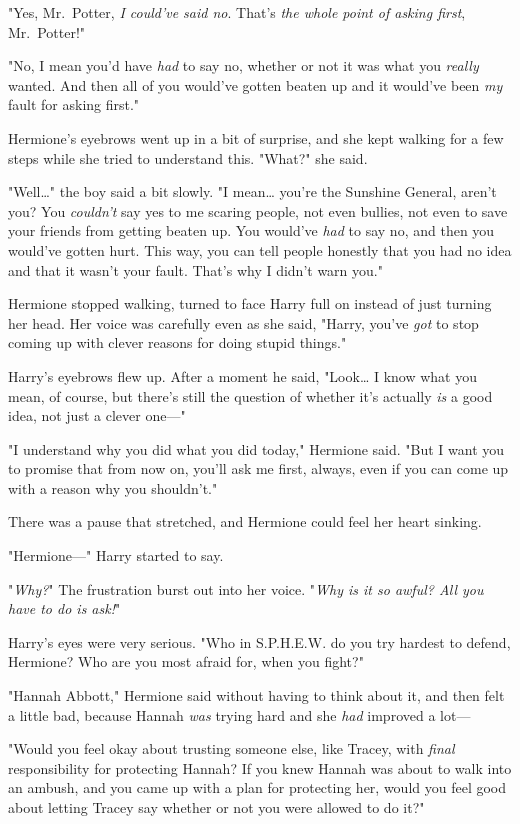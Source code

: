 "Yes, Mr.~Potter, \emph{I could've said no}. That's \emph{the whole point of 
asking first}, Mr.~Potter!"

"No, I mean you'd have \emph{had} to say no, whether or not it was what you 
\emph{really} wanted. And then all of you would've gotten beaten up and it 
would've been \emph{my} fault for asking first."

Hermione's eyebrows went up in a bit of surprise, and she kept walking for a 
few steps while she tried to understand this. "What?" she said.

"Well{\ldots}" the boy said a bit slowly. "I mean{\ldots} you're the Sunshine 
General, aren't you? You \emph{couldn't} say yes to me scaring people, not even 
bullies, not even to save your friends from getting beaten up. You would've 
\emph{had} to say no, and then you would've gotten hurt. This way, you can tell 
people honestly that you had no idea and that it wasn't your fault. That's why 
I didn't warn you."

Hermione stopped walking, turned to face Harry full on instead of just turning 
her head. Her voice was carefully even as she said, "Harry, you've \emph{got} 
to stop coming up with clever reasons for doing stupid things."

Harry's eyebrows flew up. After a moment he said, "Look{\ldots} I know what you 
mean, of course, but there's still the question of whether it's actually 
\emph{is} a good idea, not just a clever one---"

"I understand why you did what you did today," Hermione said. "But I want you 
to promise that from now on, you'll ask me first, always, even if you can come 
up with a reason why you shouldn't."

There was a pause that stretched, and Hermione could feel her heart sinking.

"Hermione---" Harry started to say.

"\emph{Why?}" The frustration burst out into her voice. "\emph{Why is it so 
awful? All you have to do is ask!}"

Harry's eyes were very serious. "Who in S.P.H.E.W. do you try hardest to 
defend, Hermione? Who are you most afraid for, when you fight?"

"Hannah Abbott," Hermione said without having to think about it, and then felt 
a little bad, because Hannah \emph{was} trying hard and she \emph{had} improved 
a lot---

"Would you feel okay about trusting someone else, like Tracey, with 
\emph{final} responsibility for protecting Hannah? If you knew Hannah was about 
to walk into an ambush, and you came up with a plan for protecting her, would 
you feel good about letting Tracey say whether or not you were allowed to do 
it?"

